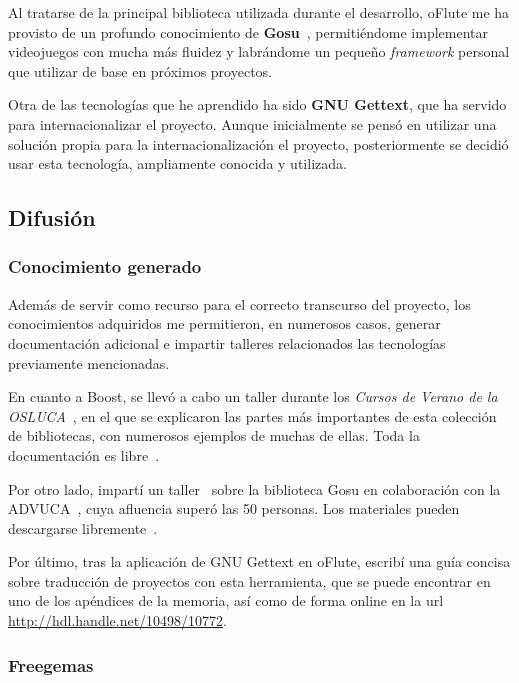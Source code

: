\documentclass[a4paper,11pt]{article}
\begin{document}
Al tratarse de la principal biblioteca utilizada durante el desarrollo, oFlute
me ha provisto de un profundo conocimiento de \textbf{Gosu}~\cite{gosu},
permitiéndome implementar videojuegos con mucha más fluidez y labrándome un
pequeño \textit{framework} personal que utilizar de base en próximos
proyectos. 

Otra de las tecnologías que he aprendido ha sido \textbf{GNU Gettext}, que ha
servido para internacionalizar el proyecto. Aunque inicialmente se pensó en
utilizar una solución propia para la internacionalización el proyecto,
posteriormente se decidió usar esta tecnología, ampliamente conocida y
utilizada.

\subsection{Difusión}

\subsubsection{Conocimiento generado}

Además de servir como recurso para el correcto transcurso del proyecto, los
conocimientos adquiridos me permitieron, en numerosos casos, generar
documentación adicional e impartir talleres relacionados las tecnologías
previamente mencionadas.

En cuanto a Boost, se llevó a cabo un taller durante los \textit{Cursos de
  Verano de la OSLUCA}~\cite{cursosverano}, en el que se explicaron las partes
más importantes de esta colección de bibliotecas, con numerosos ejemplos de
muchas de ellas. Toda la documentación es libre~\cite{materialesCursoBoost}.

Por otro lado, impartí un taller~\cite{tallergosu} sobre la biblioteca Gosu en
colaboración con la ADVUCA~\cite{advuca}, cuya afluencia superó las 50
personas. Los materiales pueden descargarse
libremente~\cite{tallergosumateriales}.

Por último, tras la aplicación de GNU Gettext en oFlute, escribí una guía
concisa sobre traducción de proyectos con esta herramienta, que se puede
encontrar en uno de los apéndices de la memoria, así como de forma online en la
url \url{http://hdl.handle.net/10498/10772}.


\subsubsection{Freegemas}
\end{document}
